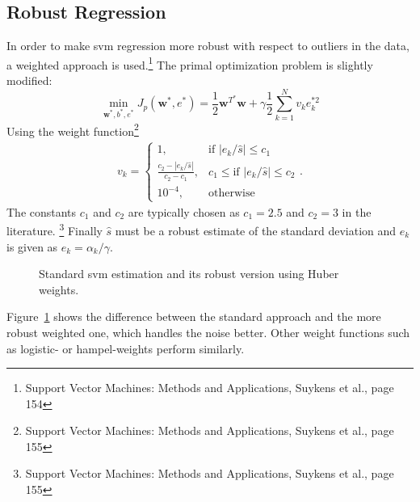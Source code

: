 \subsection{Robust Regression}
In order to make svm regression more robust with respect to outliers in the data, a weighted approach is used.\footnote{Support Vector Machines: Methods and Applications, Suykens et al., page 154} The primal optimization problem is slightly modified:
\begin{equation}
\min\limits_{\mathbf{w}^*,b^*,e^*} J_p (\mathbf{w}^*,e^*) = \frac{1}{2} \mathbf{w}^{T^*}\mathbf{w} + \gamma \frac{1}{2}\sum\limits_{k = 1}^{N} v_k e_k^{*2}
\end{equation}
Using the weight function\footnote{Support Vector Machines: Methods and Applications, Suykens et al., page 155}
\begin{align}
v_k = \begin{cases}
      	1, & \text{if }  |e_k / \hat{s} | \leq c_1 \\
      	\frac{c_2 - |e_k / \hat{s} | }{c_2 - c_1 }, &  c_1 \leq \text{if } |e_k / \hat{s} | \leq c_2 \\
      	10^{-4}, & \text{otherwise}
      \end{cases}.
\end{align} 
The constants $c_1$ and $c_2$ are typically chosen as $c_1 = 2.5$ and $c_2 = 3$ in the literature. \footnote{Support Vector Machines: Methods and Applications, Suykens et al., page 155} Finally $\hat{s}$ must be a robust estimate of the standard deviation and $e_k$ is given as $e_k = \alpha_k / \gamma$.  
\begin{figure}
\centering


\caption{Standard svm estimation and its robust version using Huber weights.}
\label{fig:robustSVM}
\end{figure}
Figure~\ref{fig:robustSVM} shows the difference between the standard approach and the more robust weighted one, which handles the noise better. Other weight functions such as logistic- or hampel-weights perform similarly.

